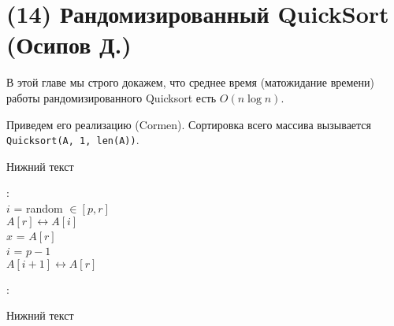 \section{(14) Рандомизированный QuickSort (Осипов Д.)}

В этой главе мы строго докажем, что среднее время (матожидание времени) работы рандомизированного Quicksort есть $O(n\log n)$.

Приведем его реализацию (Cormen). Сортировка всего массива вызывается \texttt{Quicksort(A, 1, len(A))}.

\begin{algorithm}[H]
\caption{Нижний текст}
:\\
$i$ = random $\in [p, r]$\\
$A[r] \leftrightarrow A[i]$\\
$x$ = $A[r]$ \\
$i$ = $p-1$ \\
$A[i+1] \leftrightarrow A[r]$\\

$ $\\

: \\
\end{algorithm}

\begin{algorithm}[H]
	\caption{Нижний текст}
	\DontPrintSemicolon
	\;
\end{algorithm}


